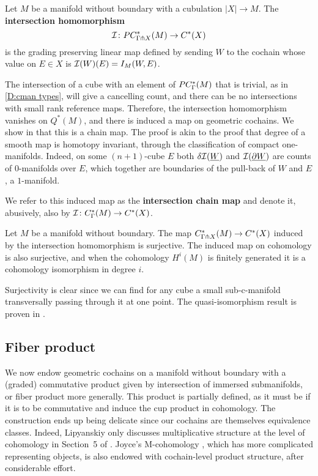 \begin{definition}\label{D:intersection homomorphism}
	Let $M$ be a manifold without boundary with a cubulation $|X| \to M$.
	The \textbf{intersection homomorphism}
	\[
	\mathcal{I} \colon PC^*_{\Gamma \pitchfork X}(M) \to C^{\ast}(X)
	\]
	is the grading preserving linear map defined by sending $W$ to the cochain whose value on $E \in X$ is $\mathcal{I}(W)(E) = I_M(W, E)$.
\end{definition}

The intersection of a cube with an element of $PC_\Gamma^*(M)$ that is trivial, as in \cref{D:cman types}, will give a cancelling count, and there can be no intersections with small rank reference maps.
Therefore, the intersection homomorphism vanishes on $Q^*(M)$, and there is induced a map on geometric cochains.
We show in \cite[Proposition 6.14]{medina2022foundations} that this is a chain map.
The proof is akin to the proof that degree of a smooth map is homotopy invariant, through the classification of compact one-manifolds.
Indeed, on some $(n+1)$-cube $E$ both $\delta \mathcal{I}(\underline{W})$ and $\mathcal{I}(\underline{\partial W})$ are counts of $0$-manifolds over $E$, which together are boundaries of the pull-back of $W$ and $E$, a $1$-manifold.

We refer to this induced map as the \textbf{intersection chain map} and denote it, abusively, also by $\mathcal{I} \colon C_\Gamma^*(M)\to C^*(X)$.

\begin{theorem}\label{T:stokes}
	Let $M$ be a manifold without boundary.
	The map $C^*_{\Gamma \pitchfork X}(M) \to C^{\ast}(X)$ induced by the intersection homomorphism is surjective.
	The induced map on cohomology is also surjective, and when the cohomology $H^i(M)$ is finitely generated it is a cohomology isomorphism in degree $i$.
\end{theorem}

Surjectivity is clear since we can find for any cube a small sub-c-manifold transversally passing through it at one point.
The quasi-isomorphism result is proven in \cite[Theorem 6.21]{medina2022foundations}.

\subsection{Fiber product}\label{S:fiber product section}

We now endow geometric cochains on a manifold without boundary with a (graded) commutative product given by intersection of immersed submanifolds, or fiber product more generally.
This product is partially defined, as it must be if it is to be commutative and induce the cup product in cohomology.
The construction ends up being delicate since our cochains are themselves equivalence classes.
Indeed, Lipyanskiy only discusses multiplicative structure at the level of cohomology in Section~5 of \cite{Lipy14}.
Joyce's M-cohomology \cite{Joyc15}, which has more complicated representing objects, is also endowed with cochain-level product structure, after considerable effort.

